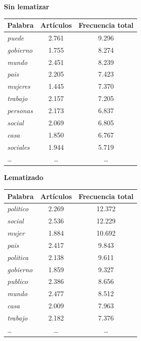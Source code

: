 \documentclass[
]{article}
\begin{document}
\begin{table}[H]
\centering
\begin{minipage}[t]{0.48\linewidth}
\centering
\textbf{Sin lematizar}\\[6pt]
\begin{tabular}{@{}lcc@{}}
\toprule
Palabra & Artículos & Frecuencia total \\
\midrule
\emph{puede} & 2.761 & 9.296 \\ \midrule
\emph{gobierno} & 1.755 & 8.274 \\ \midrule
\emph{mundo} & 2.451 & 8.239 \\ \midrule
\emph{pais} & 2.205 & 7.423 \\ \midrule
\emph{mujeres} & 1.445 & 7.370 \\ \midrule
\emph{trabajo} & 2.157 & 7.205 \\ \midrule
\emph{personas} & 2.173 & 6.837 \\ \midrule
\emph{social} & 2.069 & 6.805 \\ \midrule
\emph{casa} & 1.850 & 6.767 \\ \midrule
\emph{sociales} & 1.944 & 5.719 \\ \midrule
\ldots{} & \ldots{} & \ldots{} \\
\bottomrule
\end{tabular}
\end{minipage}
\hfill
\begin{minipage}[t]{0.48\linewidth}
\centering
\textbf{Lematizado}\\[6pt]
\begin{tabular}{@{}lcc@{}}
\toprule
Palabra & Artículos & Frecuencia total \\
\midrule
\emph{politico} & 2.269 & 12.372 \\ \midrule
\emph{social} & 2.536 & 12.229 \\ \midrule
\emph{mujer} & 1.884 & 10.692 \\ \midrule
\emph{pais} & 2.417 & 9.843 \\ \midrule
\emph{politica} & 2.138 & 9.611 \\ \midrule
\emph{gobierno} & 1.859 & 9.327 \\ \midrule
\emph{publico} & 2.386 & 8.656 \\ \midrule
\emph{mundo} & 2.477 & 8.512 \\ \midrule
\emph{casa} & 2.009 & 7.963 \\ \midrule
\emph{trabajo} & 2.182 & 7.376 \\ \midrule
\ldots{} & \ldots{} & \ldots{} \\
\bottomrule
\end{tabular}
\end{minipage}
\end{table}
\end{document}
